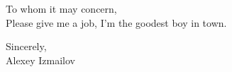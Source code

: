 \documentclass{mycv}
\begin{document}
\maketitle

To whom it may concern, \\

Please give me a job, I'm the goodest boy in town. 

Sincerely, \\  

Alexey Izmailov 



%
%
%
\end{document}
